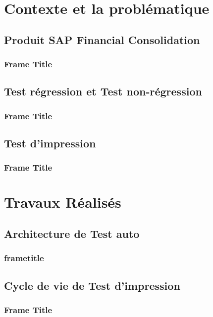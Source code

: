 \documentclass{beamer}
\begin{document}
        
    \section{Contexte et la problématique}
        
        \subsection{Produit SAP Financial Consolidation}
        \begin{frame}
        \frametitle{Frame Title}
            
        \end{frame}
        
        \subsection{Test régression et Test non-régression}
        \begin{frame}
        \frametitle{Frame Title}
            
        \end{frame}
        
        \subsection{Test d'impression}
        \begin{frame}
        \frametitle{Frame Title}
            
        \end{frame}
        
    \section{Travaux Réalisés}
        \subsection{Architecture de Test auto}
        \begin{frame}
        \frametitle{frametitle}    
        \end{frame}
        
        \subsection{Cycle de vie de Test d'impression}
        \begin{frame}
        \frametitle{Frame Title}
            
        \end{frame}
        
\end{document}
